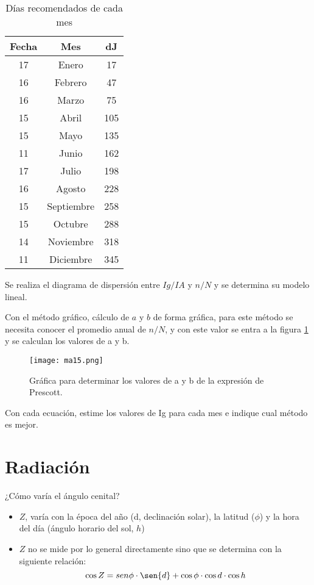 \begin{table}[h!]
    \centering
    \begin{tabular}{@{}ccc@{}}
    \toprule
    Fecha & Mes        & dJ  \\ \midrule
    17    & Enero      & 17  \\
    16    & Febrero    & 47  \\
    16    & Marzo      & 75  \\
    15    & Abril      & 105 \\
    15    & Mayo       & 135 \\
    11    & Junio      & 162 \\
    17    & Julio      & 198 \\
    16    & Agosto     & 228 \\
    15    & Septiembre & 258 \\
    15    & Octubre    & 288 \\
    14    & Noviembre  & 318 \\
    11    & Diciembre  & 345 \\ \bottomrule
    \end{tabular}
    \caption{Días recomendados de cada mes}
    \label{tabma10}
\end{table}
Se realiza el diagrama de dispersión entre $Ig/IA$ y $n/N$ y se determina su modelo lineal.

Con el método gráfico, cálculo de $a$ y $b$ de forma gráfica, para este método se necesita conocer el promedio anual de $n/N$, y con este valor se entra a la figura \ref{ma15} y se calculan los valores de a y b. 
\begin{figure}[h!]
\centering
  \texttt{[image: ma15.png]}
  \caption{Gráfica para determinar los valores de a y b de la expresión de Prescott.}
  \label{ma15}
\end{figure}
Con cada ecuación, estime los valores de Ig para cada mes e indique cual método es mejor.

\section{Radiación}

¿Cómo varía el ángulo cenital?
\begin{itemize}
    \item $Z$, varía con la época del año (d, declinación solar), la latitud ($\phi$) y la hora del día (ángulo horario del sol, $h$)
    \item $Z$ no se mide por lo general directamente sino que se determina con la siguiente relación:
    \begin{equation}
        \cos{Z} = sen{\phi} \cdot \sen{d}+ \cos{\phi} \cdot \cos{d} \cdot \cos{h}
    \end{equation}
\end{itemize}

